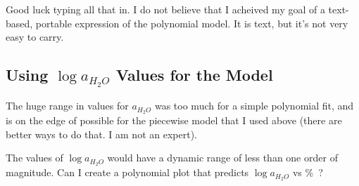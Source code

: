 \documentclass[]{tufte-handout}
\begin{document}
Good luck typing all that in. I do not believe that I acheived my goal of a text-based, portable expression of the polynomial model. It is text, but it's not very easy to carry.
\clearpage

\subsection{Using $\log{a_{H_2O}}$ Values for the Model}

The huge range in values for $a_{H_2O}$ was too much for a simple polynomial fit, and is on the edge of possible for the piecewise model that I used above (there are better ways to do that. I am not an expert).

The values of $\log{a_{H_2O}}$ would have a dynamic range of less than one order of magnitude. Can I create a polynomial plot that predicts $\log{a_{H_2O}}$ vs \unit{{\percent{}}}?
\end{document}
